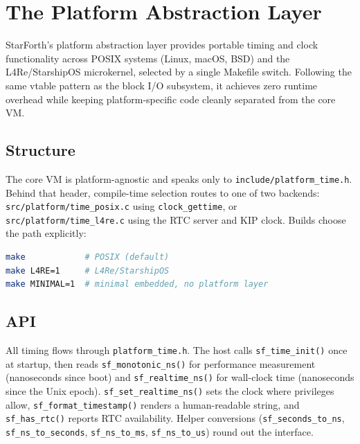 
\section{The Platform Abstraction Layer}

StarForth's platform abstraction layer provides portable timing and clock
functionality across POSIX systems (Linux, macOS, BSD) and the L4Re/StarshipOS
microkernel, selected by a single Makefile switch. Following the same vtable
pattern as the block I/O subsystem, it achieves zero runtime overhead while
keeping platform-specific code cleanly separated from the core VM.

\subsection{Structure}

The core VM is platform-agnostic and speaks only to
\texttt{include/platform\_time.h}. Behind that header, compile-time selection
routes to one of two backends: \texttt{src/platform/time\_posix.c} using
\texttt{clock\_gettime}, or \texttt{src/platform/time\_l4re.c} using the RTC
server and KIP clock. Builds choose the path explicitly:

\begin{lstlisting}[language=bash]
make            # POSIX (default)
make L4RE=1     # L4Re/StarshipOS
make MINIMAL=1  # minimal embedded, no platform layer
\end{lstlisting}

\subsection{API}

All timing flows through \texttt{platform\_time.h}. The host calls
\texttt{sf\_time\_init()} once at startup, then reads
\texttt{sf\_monotonic\_ns()} for performance measurement (nanoseconds since
boot) and \texttt{sf\_realtime\_ns()} for wall-clock time (nanoseconds since the
Unix epoch). \texttt{sf\_set\_realtime\_ns()} sets the clock where privileges
allow, \texttt{sf\_format\_timestamp()} renders a human-readable string, and
\texttt{sf\_has\_rtc()} reports RTC availability. Helper conversions
(\texttt{sf\_seconds\_to\_ns}, \texttt{sf\_ns\_to\_seconds},
\texttt{sf\_ns\_to\_ms}, \texttt{sf\_ns\_to\_us}) round out the interface.

